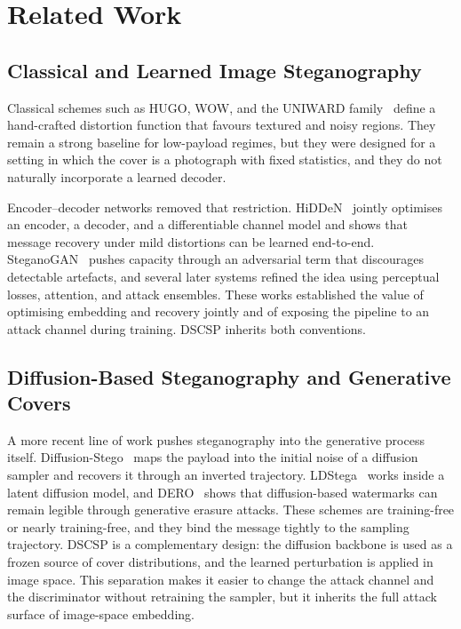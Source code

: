 \documentclass[journal]{IEEEtran}
\begin{document}
\section{Related Work}
\label{sec:rw}

\subsection{Classical and Learned Image Steganography}
Classical schemes such as HUGO, WOW, and the UNIWARD
family~\cite{pevny2010using, holub2012designing, holub2014universal}
define a hand-crafted distortion function that favours textured and
noisy regions. They remain a strong baseline for low-payload
regimes, but they were designed for a setting in which the cover is
a photograph with fixed statistics, and they do not naturally
incorporate a learned decoder.

Encoder--decoder networks removed that restriction.
HiDDeN~\cite{zhu2018hidden} jointly optimises an encoder, a decoder,
and a differentiable channel model and shows that message recovery
under mild distortions can be learned end-to-end.
SteganoGAN~\cite{zhang2019steganogan} pushes capacity through an
adversarial term that discourages detectable artefacts, and several
later systems refined the idea using perceptual losses, attention, and
attack ensembles. These works established the value of optimising
embedding and recovery jointly and of exposing the pipeline to an
attack channel during training. DSCSP inherits both conventions.

\subsection{Diffusion-Based Steganography and Generative Covers}
A more recent line of work pushes steganography into the generative
process itself. Diffusion-Stego~\cite{wei2023diffusionstego} maps the
payload into the initial noise of a diffusion sampler and recovers it
through an inverted trajectory. LDStega~\cite{zhang2024ldstega} works
inside a latent diffusion model, and DERO~\cite{zhao2024dero} shows
that diffusion-based watermarks can remain legible through generative
erasure attacks. These schemes are training-free or nearly
training-free, and they bind the message tightly to the sampling
trajectory. DSCSP is a complementary design: the diffusion backbone
is used as a frozen source of cover distributions, and the learned
perturbation is applied in image space. This separation makes it
easier to change the attack channel and the discriminator without
retraining the sampler, but it inherits the full attack surface of
image-space embedding.
\end{document}
